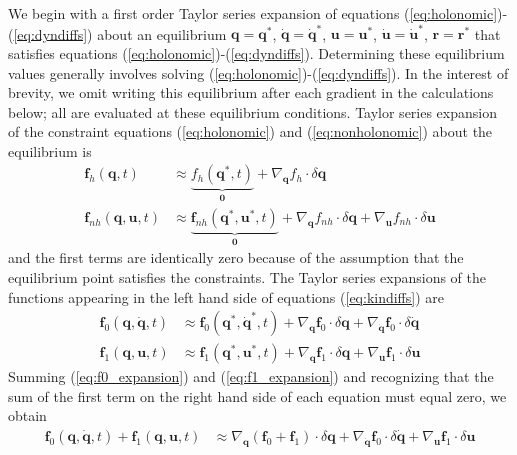 \documentclass{svjour3}                     %
\begin{document}
We begin with a first order Taylor series expansion of equations
(\ref{eq:holonomic})-(\ref{eq:dyndiffs}) about an equilibrium
$\bm{q}=\bm{q}^*$, $\bm{\dot{q}}=\bm{\dot{q}}^*$, $\bm{u}=\bm{u}^*$,
$\bm{\dot{u}}=\bm{\dot{u}}^*$, $\bm{r}=\bm{r}^*$ that satisfies equations
(\ref{eq:holonomic})-(\ref{eq:dyndiffs}).  Determining these equilibrium values
generally involves solving (\ref{eq:holonomic})-(\ref{eq:dyndiffs}).  In the interest of brevity, we omit writing this equilibrium after
each gradient in the calculations below; all are evaluated at these equilibrium
conditions.  Taylor series expansion of the constraint equations
(\ref{eq:holonomic}) and (\ref{eq:nonholonomic}) about the equilibrium is
\begin{align}
  \label{eq:holonomic_expansion}
  \bm{f}_{h}(\bm{q}, t) &\approx \underbrace{f_{h}(\bm{q}^*, t)}_{\bm{0}} +
    \nabla_{\bm{q}}f_{h} \cdot \delta \bm{q}\\
  \label{eq:nonholonomic_expansion}
  \bm{f}_{nh}(\bm{q}, \bm{u}, t) &\approx \underbrace{\bm{f}_{nh}(\bm{q}^*,
  \bm{u}^*, t)}_{\bm{0}} +  \nabla_{\bm{q}}f_{nh} \cdot \delta \bm{q} +
  \nabla_{\bm{u}}f_{nh} \cdot \delta \bm{u}
\end{align}
and the first terms are identically zero because of the assumption that the
equilibrium point satisfies the constraints.  The Taylor series expansions of
the functions appearing in the left hand side of equations (\ref{eq:kindiffs})
are
\begin{align}
  \label{eq:f0_expansion}
  \bm{f}_{0}(\bm{q}, \bm{\dot{q}}, t) &\approx \bm{f}_{0}(\bm{q}^*,
  \bm{\dot{q}}^*, t) + \nabla_{\bm{q}}\bm{f}_{0} \cdot \delta\bm{q} +
  \nabla_{\bm{\dot{q}}}\bm{f}_{0} \cdot \delta\bm{\dot{q}}\\
  \label{eq:f1_expansion}
  \bm{f}_{1}(\bm{q}, \bm{u}, t) &\approx \bm{f}_{1}(\bm{q}^*,
  \bm{u}^*, t) + \nabla_{\bm{q}}\bm{f}_{1} \cdot \delta\bm{q} +
  \nabla_{\bm{u}}\bm{f}_{1} \cdot \delta\bm{u}
\end{align}
Summing (\ref{eq:f0_expansion}) and (\ref{eq:f1_expansion}) and recognizing
that the sum of the first term on the right hand side of each equation must
equal zero, we obtain
\begin{align}
  \label{eq:f0_plus_f1_expansion}
  \bm{f}_{0}(\bm{q}, \bm{\dot{q}}, t) + \bm{f}_{1}(\bm{q}, \bm{u}, t) &\approx
  \nabla_{\bm{q}}(\bm{f}_{0} + \bm{f}_{1}) \cdot \delta\bm{q} +
  \nabla_{\bm{\dot{q}}}\bm{f}_{0} \cdot \delta\bm{\dot{q}} +
  \nabla_{\bm{u}}\bm{f}_{1} \cdot \delta\bm{u}
\end{align}
\end{document}
